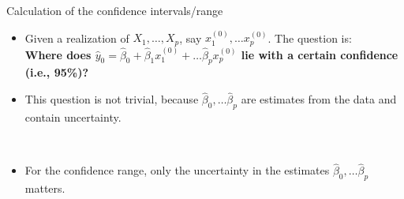 \documentclass[
  10pt,
  ignorenonframetext,
]{beamer}
\providecommand{\tightlist}{%
  \setlength{\itemsep}{0pt}\setlength{\parskip}{0pt}}
\begin{document}
\begin{frame}
\begin{block}{Calculation of the confidence intervals/range}
\protect\hypertarget{calculation-of-the-confidence-intervalsrange}{}
\(~\)

\begin{itemize}
\tightlist
\item
  Given a realization of \(X_1, \ldots ,X_p\), say
  \(x_1^{(0)}, \ldots x_p^{(0)}\). The question is:\\
  \vspace{2mm} \textbf{Where does
  \(\hat y_0 = \hat\beta_0 + \hat\beta_1 x_1^{(0)} + \ldots \hat\beta_p x_p^{(0)}\)
  lie with a certain confidence (i.e., 95\%)?}
\end{itemize}

\vspace{6mm}

\begin{itemize}
\tightlist
\item
  This question is not trivial, because
  \(\hat\beta_0, \ldots \hat\beta_p\) are estimates from the data and
  contain uncertainty.
\end{itemize}

\(~\)

\vspace{4mm}

\begin{itemize}
\tightlist
\item
  For the confidence range, only the uncertainty in the estimates
  \(\hat\beta_0, \ldots \hat\beta_p\) matters.
\end{itemize}
\end{block}
\end{frame}
\end{document}
